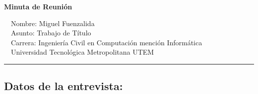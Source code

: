 \documentclass[10pt,letterpaper]{article}
\begin{document}
\begin{center}
{\LARGE \textbf{Minuta de Reunión}}

\ \ \textbullet Nombre: Miguel Fuenzalida
\\
\ \ \textbullet Asunto: Trabajo de Título
\\
\ \ \textbullet Carrera: Ingeniería Civil en Computación mención Informática
\\
\ \ \textbullet Universidad Tecnológica Metropolitana UTEM
\end{center}

\hrule
\vspace{-0.4em}
\subsection*{Datos de la entrevista:}
\end{document}
